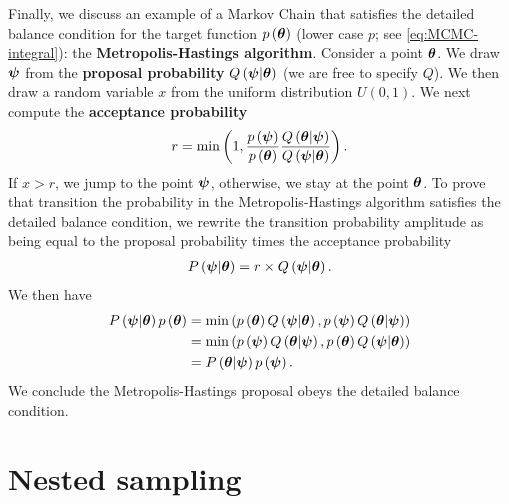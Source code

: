 Finally, we discuss an example of a Markov Chain that satisfies  the detailed balance condition for the target function $p\left({\bm \theta}\right)$ (lower case $p$; see \eqref{eq:MCMC-integral}): the \textbf{Metropolis-Hastings algorithm}.
Consider a point ${\bm \theta}$.
We draw ${\bm \psi}$ from the \textbf{proposal probability} $Q\left({\bm \psi}|{\bm \theta}\right)$
(we are free to specify $Q$).
We then draw a random variable $x$ from the uniform distribution $U\left(0,1\right)$. We next compute the \textbf{acceptance probability} 
\begin{align}
    \label{eq:metropolis-p}
    r 
    =
    \min\left(
        1,
        \frac{p\left({\bm \psi}\right)}{p\left({\bm \theta}\right)}
        \frac{Q\left({\bm \theta}|{\bm \psi}\right)}{Q\left({\bm \psi}|{\bm \theta}\right)}
    \right)
    .
\end{align}
If $x>r$, we jump to the point ${\bm \psi}$, otherwise, we stay at the point ${\bm \theta}$.
To prove that transition the probability in the Metropolis-Hastings algorithm satisfies the detailed balance condition, we rewrite the transition probability amplitude as being equal to the proposal probability times the acceptance probability
\begin{align}
    P\left({\bm \psi}|{\bm \theta}\right)
    =
    r \times Q\left({\bm \psi}|{\bm \theta}\right)
    .
\end{align}
We then have
\begin{align}
    P\left({\bm \psi}|{\bm \theta}\right)p\left({\bm \theta}\right)
    &=
    \min\left(
        p\left({\bm \theta}\right)Q\left({\bm \psi}|{\bm \theta}\right)
        ,
        p\left({\bm \psi}\right)Q\left({\bm \theta}|{\bm \psi}\right)
    \right)
    \nonumber\\
    &=
    \min\left(
        p\left({\bm \psi}\right)Q\left({\bm \theta}|{\bm \psi}\right)
        ,
        p\left({\bm \theta}\right)Q\left({\bm \psi}|{\bm \theta}\right)
    \right)
    \nonumber\\
    &=
    P\left({\bm \theta}|{\bm \psi}\right)p\left({\bm \psi}\right)
    .
\end{align}
We conclude the Metropolis-Hastings proposal obeys the detailed balance condition.

\section{Nested sampling\label{sec:nested-sampling}}

